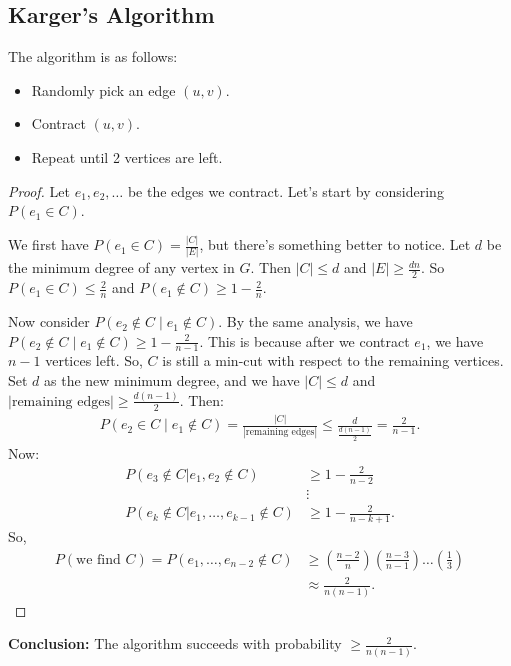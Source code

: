 \documentclass{report}
\begin{document}
\subsection{Karger's Algorithm}
\noindent The algorithm is as follows:
\begin{itemize}
    \item Randomly pick an edge $(u, v)$.
    \item Contract $(u, v)$.
    \item Repeat until 2 vertices are left.
\end{itemize}
\begin{proof}
    Let $e_1, e_2, \ldots$ be the edges we contract. Let's start by considering $P(e_1 \in C)$.

    We first have $P(e_1 \in C) = \frac{|C|}{|E|}$, but there's something better to notice. Let $d$ be the minimum degree of any vertex in $G$. Then $|C| \leq d$ and $|E| \geq \frac{dn}{2}$. So $P(e_1 \in C) \leq \frac{2}{n}$ and $P(e_1 \notin C) \geq 1 - \frac{2}{n}$.

    Now consider $P(e_2 \notin C \mid e_1 \notin C)$. By the same analysis, we have $P(e_2 \notin C \mid e_1 \notin C) \geq 1- \frac{2}{n-1}$. This is because after we contract $e_1$, we have $n-1$ vertices left. So, $C$ is still a min-cut with respect to the remaining vertices. Set $d$ as the new minimum degree, and we have $|C| \leq d$ and $|\text{remaining edges}| \geq \frac{d(n-1)}{2}$. Then:
    \begin{align*}
        P(e_2 \in C \mid e_1 \notin C) = \frac{|C|}{|\text{remaining edges}|} \leq \frac{d}{\frac{d(n-1)}{2}} = \frac{2}{n-1}.
    \end{align*}
    Now:
    \begin{align*}
        P(e_3 \notin C | e_1, e_2 \notin C) &\geq 1 - \frac{2}{n-2} \\
        &\vdots \\
        P(e_k \notin C | e_1, \ldots, e_{k-1} \notin C) &\geq 1 - \frac{2}{n-k+1}.
    \end{align*}
    So,
    \begin{align*}
        P(\text{we find } C) = P(e_1, \ldots, e_{n-2} \notin C) &\geq \left(\frac{n-2}{n}\right) \left(\frac{n-3}{n-1}\right) \ldots \left(\frac{1}{3}\right) \\
        &\approx \frac{2}{n(n-1)}.
    \end{align*}
\end{proof}
\textbf{Conclusion:} The algorithm succeeds with probability $\geq  \frac{2}{n(n-1)}$.
\end{document}
